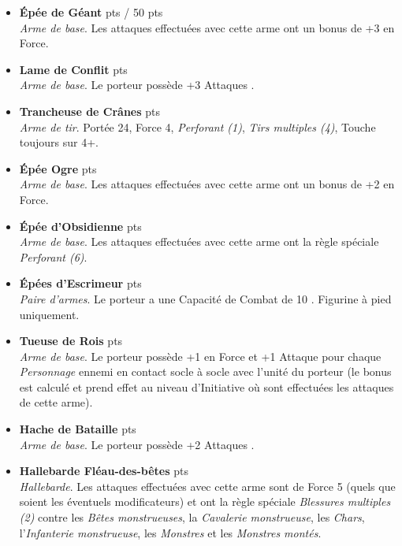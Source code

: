 \begin{multicols}{2}
\begin{itemize}[label={-}]
\item \textbf{Épée de Géant}  {pts} / 50 {pts} \\
\textit{Arme de base}. Les attaques effectuées avec cette arme ont un bonus de +3 en Force.

\item \textbf{Lame de Conflit}  {pts} \\
\textit{Arme de base}. Le porteur possède +3 Attaques .

\item \textbf{Trancheuse de Crânes}  {pts} \\
\textit{Arme de tir}. Portée \unit{24}{\pouce}, Force 4, \emph{Perforant (1)}, \emph{Tirs multiples (4)}, Touche toujours sur 4+.

\item \textbf{Épée Ogre}  {pts} \\
\textit{Arme de base}. Les attaques effectuées avec cette arme ont un bonus de +2 en Force.

\item \textbf{Épée d'Obsidienne}  {pts} \\
\textit{Arme de base}. Les attaques effectuées avec cette arme ont la règle spéciale \emph{Perforant (6)}.

\item \textbf{Épées d'Escrimeur}  {pts} \\
\textit{Paire d'armes}. Le porteur a une Capacité de Combat de 10 . Figurine à pied uniquement.

\item \textbf{Tueuse de Rois}  {pts} \\
\textit{Arme de base}. Le porteur possède +1 en Force et +1 Attaque  pour chaque \emph{Personnage} ennemi en contact socle à socle avec l'unité du porteur (le bonus est calculé et prend effet au niveau d'Initiative où sont effectuées les attaques de cette arme).

\item \textbf{Hache de Bataille}  {pts} \\
\textit{Arme de base}. Le porteur possède +2 Attaques .

\item \textbf{Hallebarde Fléau-des-bêtes}  {pts} \\
\textit{Hallebarde}. Les attaques effectuées avec cette arme sont de Force 5 (quels que soient les éventuels modificateurs) et ont la règle spéciale \emph{Blessures multiples (2)} contre les \emph{Bêtes monstrueuses}, la \emph{Cavalerie monstrueuse}, les \emph{Chars}, l'\emph{Infanterie monstrueuse}, les \emph{Monstres} et les \emph{Monstres montés}.


\end{itemize}
\end{multicols}
